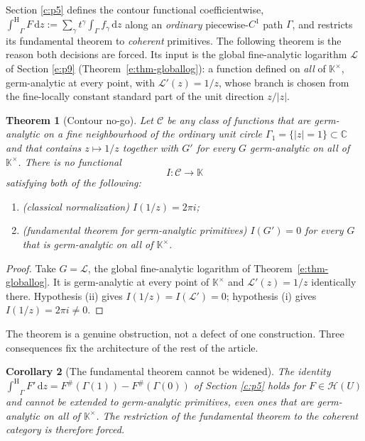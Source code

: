 \documentclass[11pt,a4paper]{article}
\numberwithin{equation}{section}
\newtheorem{theorem}{Theorem}[section]
\newtheorem{corollary}[theorem]{Corollary}
\theoremstyle{definition}
\theoremstyle{remark}
\theoremstyle{plain}
\newcommand{\K}{\mathbb K}
\newcommand{\CC}{\mathbb C}
\newcommand{\tm}{t}
\newcommand{\ev}[1]{#1^{\#}}
\newcommand{\Hc}{\mathcal H}
\newcommand{\intH}{{\int^{\mathrm H}}}
\newcommand{\abs}[1]{\lvert #1\rvert}
\newcommand{\dd}{\mathrm d}
\begin{document}
Section \ref{c:p5} defines the contour functional coefficientwise,
$\intH_\Gamma F\,\dd z:=\sum_\gamma\tm^{\gamma}\int_\Gamma f_\gamma\,\dd z$
along an \emph{ordinary} piecewise-$C^1$ path $\Gamma$, and restricts its
fundamental theorem to \emph{coherent} primitives. The following theorem
is the reason both decisions are forced. Its input is the global
fine-analytic logarithm $\mathcal L$ of Section \ref{e:p9}
(Theorem~\ref{e:thm-globallog}): a function defined on \emph{all} of
$\K^{\times}$, germ-analytic at every point, with
$\mathcal L'(z)=1/z$, whose branch is chosen from the fine-locally
constant standard part of the unit direction $z/\abs z$.

\begin{theorem}[Contour no-go]
\label{b:nogo}
Let $\mathcal C$ be any class of functions that are germ-analytic on a
fine neighbourhood of the ordinary unit circle
$\Gamma_1=\{\abs z=1\}\subset\CC$ and that contains $z\mapsto1/z$
together with $G'$ for every $G$ germ-analytic on all of $\K^{\times}$.
There is no functional
\[
 I:\mathcal C\longrightarrow\K
\]
satisfying both of the following:
\begin{enumerate}[label=\textup{(\roman*)},leftmargin=2.4em]
\item \textup{(classical normalization)}
$I(1/z)=2\pi i$;
\item \textup{(fundamental theorem for germ-analytic primitives)}
$I(G')=0$ for every $G$ that is germ-analytic on all of $\K^{\times}$.
\end{enumerate}
\end{theorem}

\begin{proof}
Take $G=\mathcal L$, the global fine-analytic logarithm of
Theorem~\ref{e:thm-globallog}. It is germ-analytic at every point of
$\K^{\times}$ and $\mathcal L'(z)=1/z$ identically there. Hypothesis
(ii) gives $I(1/z)=I(\mathcal L')=0$; hypothesis (i) gives
$I(1/z)=2\pi i\ne0$.
\end{proof}

The theorem is a genuine obstruction, not a defect of one construction.
Three consequences fix the architecture of the rest of the article.

\begin{corollary}[The fundamental theorem cannot be widened]
\label{b:nogo-fundamental}
The identity $\intH_\Gamma F'\,\dd z=\ev F(\Gamma(1))-\ev F(\Gamma(0))$ of
Section \ref{c:p5} holds for $F\in\Hc(U)$ and cannot be extended to
germ-analytic primitives, even ones that are germ-analytic on all of
$\K^{\times}$. The restriction of the fundamental theorem to the coherent
category is therefore forced.
\end{corollary}
\end{document}
